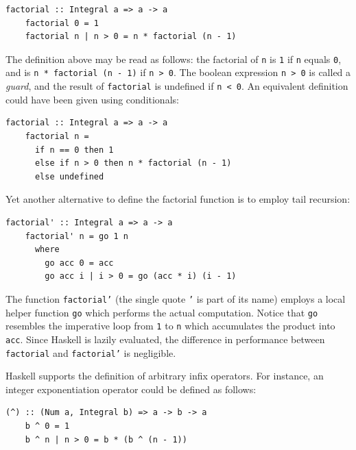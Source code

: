 \documentclass[UdineBachThesis,american,11pt]{PhdThesis}
\begin{document}
  \begin{Verbatim}[gobble=4,fontsize=\small]
    factorial :: Integral a => a -> a
    factorial 0 = 1
    factorial n | n > 0 = n * factorial (n - 1)
  \end{Verbatim}

  The definition above may be read as follows: the factorial of \texttt{n} is
  \texttt{1} if \texttt{n} equals \texttt{0}, and is
  \mbox{\texttt{n * factorial (n - 1)}} if \mbox{\texttt{n > 0}}. The boolean
  expression \mbox{\texttt{n > 0}} is called a \emph{guard}, and the result of
  \mbox{\texttt{factorial}} is undefined if \mbox{\texttt{n < 0}}. An equivalent
  definition could have been given using conditionals:

  \begin{Verbatim}[gobble=4,fontsize=\small]
    factorial :: Integral a => a -> a
    factorial n =
      if n == 0 then 1
      else if n > 0 then n * factorial (n - 1)
      else undefined
  \end{Verbatim}

  Yet another alternative to define the factorial function is to employ tail
  recursion:

  \pagebreak

  \begin{Verbatim}[gobble=4,fontsize=\small]
    factorial' :: Integral a => a -> a
    factorial' n = go 1 n
      where
        go acc 0 = acc
        go acc i | i > 0 = go (acc * i) (i - 1)
  \end{Verbatim}

  The function \mbox{\texttt{factorial'}} (the single quote \texttt{'} is part
  of its name) employs a local helper function \mbox{\texttt{go}} which performs
  the actual computation. Notice that \mbox{\texttt{go}} resembles the
  imperative loop from \texttt{1} to \texttt{n} which accumulates the product
  into \mbox{\texttt{acc}}. Since Haskell is lazily evaluated, the difference in
  performance between \mbox{\texttt{factorial}} and \mbox{\texttt{factorial'}}
  is negligible.

  Haskell supports the definition of arbitrary infix operators. For instance, an
  integer exponentiation operator could be defined as follows:

  \begin{Verbatim}[gobble=4,fontsize=\small]
    (^) :: (Num a, Integral b) => a -> b -> a
    b ^ 0 = 1
    b ^ n | n > 0 = b * (b ^ (n - 1))
  \end{Verbatim}
\end{document}
